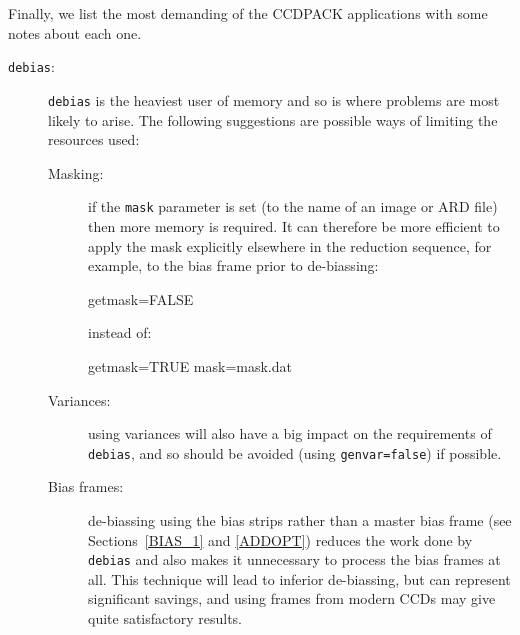 \documentclass[twoside,11pt]{starlink}
\begin{document}
Finally, we list the most demanding of the CCDPACK applications with some
notes about each one.

\begin{description}

  \item[\texttt{debias}:] \texttt{debias} is the heaviest user of memory and so
   is where problems are most likely to arise.
   The following suggestions are possible ways of limiting the resources
   used:

  \begin{description}

    \item[Masking:] if the \texttt{mask} parameter is set (to the name of an
     image or ARD file) then more memory is required.
     It can therefore be more efficient to apply the mask explicitly elsewhere
     in the reduction sequence, for example, to the bias frame prior to
     de-biassing:

\begin{small}
\begin{terminalv}
         getmask=FALSE
\end{terminalv}
\end{small}

     instead of:

\begin{small}
\begin{terminalv}
         getmask=TRUE mask=mask.dat
\end{terminalv}
\end{small}

    \item[Variances:] using variances will also have a big impact on the
     requirements of \texttt{debias}, and so should be avoided (using \texttt{genvar=false}) if possible.

    \item[Bias frames:] de-biassing using the bias strips rather than
     a master bias frame (see Sections~\ref{BIAS_1} and \ref{ADDOPT})
     reduces the work done by \texttt{debias} and also makes it unnecessary
     to process the bias frames at all.
     This technique will lead to inferior de-biassing, but can represent
     significant savings, and using frames from modern CCDs may give quite
     satisfactory results.

  \end{description}


\end{description}
\end{document}
